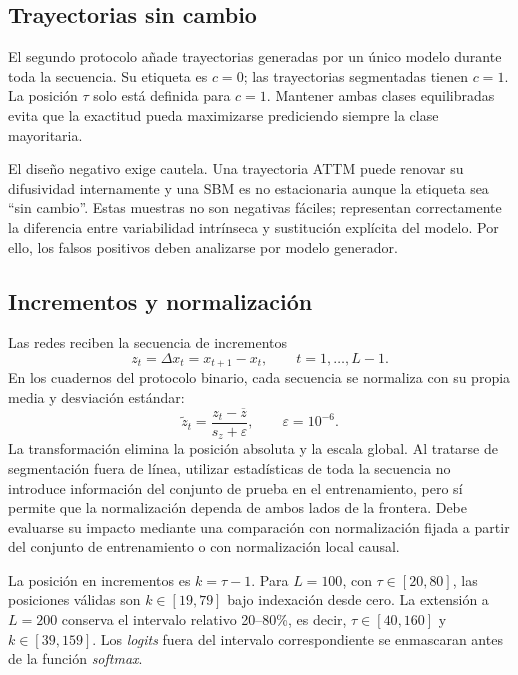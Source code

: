 \documentclass[a4paper,12pt]{article}
\begin{document}
\subsection{Trayectorias sin cambio}

El segundo protocolo añade trayectorias generadas por un único modelo durante toda la secuencia. Su etiqueta es $c=0$; las trayectorias segmentadas tienen $c=1$. La posición $\tau$ solo está definida para $c=1$. Mantener ambas clases equilibradas evita que la exactitud pueda maximizarse prediciendo siempre la clase mayoritaria.

El diseño negativo exige cautela. Una trayectoria ATTM puede renovar su difusividad internamente y una SBM es no estacionaria aunque la etiqueta sea ``sin cambio''. Estas muestras no son negativas fáciles; representan correctamente la diferencia entre variabilidad intrínseca y sustitución explícita del modelo. Por ello, los falsos positivos deben analizarse por modelo generador.

\subsection{Incrementos y normalización}

Las redes reciben la secuencia de incrementos
\begin{equation}
  z_t=\Delta x_t=x_{t+1}-x_t,
  \qquad t=1,\ldots,L-1.
  \label{eq:increments}
\end{equation}
En los cuadernos del protocolo binario, cada secuencia se normaliza con su propia media y desviación estándar:
\begin{equation}
  \widetilde z_t=\frac{z_t-\overline z}{s_z+\varepsilon},
  \qquad \varepsilon=10^{-6}.
  \label{eq:normalization}
\end{equation}
La transformación elimina la posición absoluta y la escala global. Al tratarse de segmentación fuera de línea, utilizar estadísticas de toda la secuencia no introduce información del conjunto de prueba en el entrenamiento, pero sí permite que la normalización dependa de ambos lados de la frontera. Debe evaluarse su impacto mediante una comparación con normalización fijada a partir del conjunto de entrenamiento o con normalización local causal.

La posición en incrementos es $k=\tau-1$. Para $L=100$, con $\tau\in[20,80]$, las posiciones válidas son $k\in[19,79]$ bajo indexación desde cero. La extensión a $L=200$ conserva el intervalo relativo 20--80\%, es decir, $\tau\in[40,160]$ y $k\in[39,159]$. Los \emph{logits} fuera del intervalo correspondiente se enmascaran antes de la función \emph{softmax}.
\end{document}
